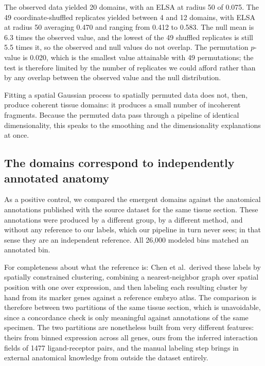 \documentclass[10pt]{article}
\begin{document}
The observed data yielded 20 domains, with an ELSA at radius 50 of 0.075. The 49 coordinate-shuffled replicates yielded between 4 and 12 domains, with ELSA at radius 50 averaging 0.470 and ranging from 0.412 to 0.583. The null mean is 6.3 times the observed value, and the lowest of the 49 shuffled replicates is still 5.5 times it, so the observed and null values do not overlap. The permutation $p$-value is 0.020, which is the smallest value attainable with 49 permutations; the test is therefore limited by the number of replicates we could afford rather than by any overlap between the observed value and the null distribution.

Fitting a spatial Gaussian process to spatially permuted data does not, then, produce coherent tissue domains: it produces a small number of incoherent fragments. Because the permuted data pass through a pipeline of identical dimensionality, this speaks to the smoothing and the dimensionality explanations at once.

\subsection*{The domains correspond to independently annotated anatomy}

As a positive control, we compared the emergent domains against the anatomical annotations published with the source dataset \cite{Chen2022} for the same tissue section. These annotations were produced by a different group, by a different method, and without any reference to our labels, which our pipeline in turn never sees; in that sense they are an independent reference. All 26,000 modeled bins matched an annotated bin.

For completeness about what the reference is: Chen et al.\ derived these labels by spatially constrained clustering, combining a nearest-neighbor graph over spatial position with one over expression, and then labeling each resulting cluster by hand from its marker genes against a reference embryo atlas. The comparison is therefore between two partitions of the same tissue section, which is unavoidable, since a concordance check is only meaningful against annotations of the same specimen. The two partitions are nonetheless built from very different features: theirs from binned expression across all genes, ours from the inferred interaction fields of 1477 ligand-receptor pairs, and the manual labeling step brings in external anatomical knowledge from outside the dataset entirely.
\end{document}
